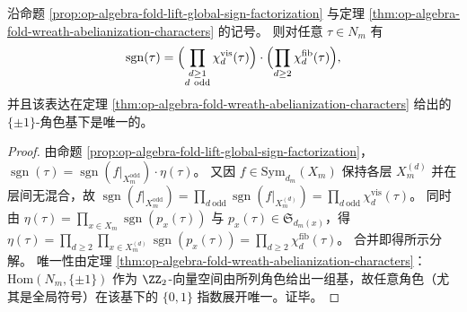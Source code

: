 \begin{corollary}[全局符号在角色基下的唯一分解]\label{cor:op-algebra-fold-global-sign-unique-decomposition}
沿命题 \ref{prop:op-algebra-fold-lift-global-sign-factorization} 与定理 \ref{thm:op-algebra-fold-wreath-abelianization-characters} 的记号。
则对任意 \(\tau\in N_m\) 有
\[
\operatorname{sgn}(\tau)
=
\Bigl(\prod_{\substack{d\ge 1\\ d\ \mathrm{odd}}}\chi^{\mathrm{vis}}_{d}(\tau)\Bigr)\cdot
\Bigl(\prod_{d\ge 2}\chi^{\mathrm{fib}}_{d}(\tau)\Bigr),
\]
并且该表达在定理 \ref{thm:op-algebra-fold-wreath-abelianization-characters} 给出的 \(\{\pm1\}\)-角色基下是唯一的。
\end{corollary}
\begin{proof}
由命题 \ref{prop:op-algebra-fold-lift-global-sign-factorization}，
\(
\operatorname{sgn}(\tau)=\operatorname{sgn}(f|_{X_m^{\mathrm{odd}}})\cdot \eta(\tau)
\)。
又因 \(f\in\mathrm{Sym}_{d_m}(X_m)\) 保持各层 \(X_m^{(d)}\) 并在层间无混合，故
\(
\operatorname{sgn}(f|_{X_m^{\mathrm{odd}}})=\prod_{d\ \mathrm{odd}}\operatorname{sgn}(f|_{X_m^{(d)}})
=\prod_{d\ \mathrm{odd}}\chi_d^{\mathrm{vis}}(\tau)
\)。
同时由 \(\eta(\tau)=\prod_{x\in X_m}\operatorname{sgn}(p_x(\tau))\) 与 \(p_x(\tau)\in \mathfrak S_{d_m(x)}\)，得
\(
\eta(\tau)=\prod_{d\ge 2}\prod_{x\in X_m^{(d)}}\operatorname{sgn}(p_x(\tau))
=\prod_{d\ge 2}\chi_d^{\mathrm{fib}}(\tau)
\)。
合并即得所示分解。
唯一性由定理 \ref{thm:op-algebra-fold-wreath-abelianization-characters}：\(\mathrm{Hom}(N_m,\{\pm1\})\) 作为 \(\ZZ_2\)-向量空间由所列角色给出一组基，故任意角色（尤其是全局符号）在该基下的 \(\{0,1\}\) 指数展开唯一。证毕。
\end{proof}

